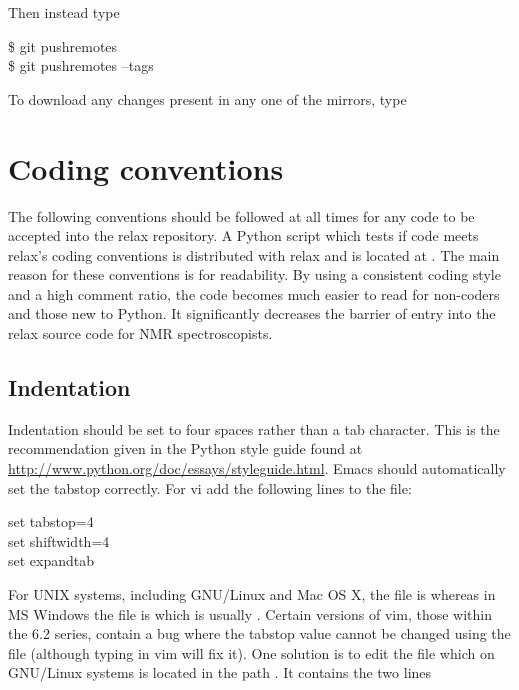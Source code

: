 Then instead type

\begin{exampleenv}
\$ git pushremotes \\
\$ git pushremotes --tags
\end{exampleenv}

To download any changes present in any one of the mirrors, type





\section{Coding conventions}

The following conventions should be followed at all times for any code to be accepted into the relax repository.
A Python script which tests if code meets relax's coding conventions is distributed with relax and is located at .
The main reason for these conventions is for readability.
By using a consistent coding style and a high comment ratio, the code becomes much easier to read for non-coders and those new to Python.
It significantly decreases the barrier of entry into the relax source code for NMR spectroscopists.



\subsection{Indentation}

Indentation should be set to four spaces rather than a tab character.
This is the recommendation given in the Python style guide found at \url{http://www.python.org/doc/essays/styleguide.html}.
Emacs should automatically set the tabstop correctly.
For vi add the following lines to the  file:

\begin{exampleenv}
set tabstop=4 \\
set shiftwidth=4 \\
set expandtab
\end{exampleenv}

For UNIX systems, including GNU/Linux and Mac OS X, the  file is  whereas in MS Windows the file is  which is usually .
Certain versions of vim, those within the 6.2 series, contain a bug where the tabstop value cannot be changed using the  file (although typing  in vim will fix it).
One solution is to edit the file  which on GNU/Linux systems is located in the path .
It contains the two lines

